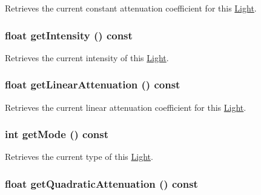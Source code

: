 Retrieves the current constant attenuation coefficient for this \hyperlink{classm3g_1_1Light}{Light}. \hypertarget{classm3g_1_1Light_ca846da41d09a6ae01d6b362c33e938d}{
\subsubsection[{getIntensity}]{\setlength{\rightskip}{0pt plus 5cm}float getIntensity () const}}
\label{classm3g_1_1Light_ca846da41d09a6ae01d6b362c33e938d}


Retrieves the current intensity of this \hyperlink{classm3g_1_1Light}{Light}. \hypertarget{classm3g_1_1Light_50e949b0cc2014e576987379cac07769}{
\subsubsection[{getLinearAttenuation}]{\setlength{\rightskip}{0pt plus 5cm}float getLinearAttenuation () const}}
\label{classm3g_1_1Light_50e949b0cc2014e576987379cac07769}


Retrieves the current linear attenuation coefficient for this \hyperlink{classm3g_1_1Light}{Light}. \hypertarget{classm3g_1_1Light_d4ce4524e4751fe5e3cfb8c270347d54}{
\subsubsection[{getMode}]{\setlength{\rightskip}{0pt plus 5cm}int getMode () const}}
\label{classm3g_1_1Light_d4ce4524e4751fe5e3cfb8c270347d54}


Retrieves the current type of this \hyperlink{classm3g_1_1Light}{Light}. \hypertarget{classm3g_1_1Light_9ec7130ca1977cfeb4b2cbebc31971b4}{
\subsubsection[{getQuadraticAttenuation}]{\setlength{\rightskip}{0pt plus 5cm}float getQuadraticAttenuation () const}}
\label{classm3g_1_1Light_9ec7130ca1977cfeb4b2cbebc31971b4}


